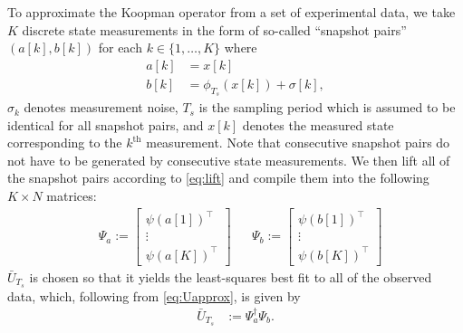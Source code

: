 To approximate the Koopman operator from a set of experimental data, we take $K$ discrete state measurements in the form of so-called ``snapshot pairs'' $(a[k] , b[k])$ for each $k \in \{1,\ldots,K\}$ where
\begin{align}
    a[k] &= x[k] \\
    b[k] &= \phi_{T_s} (x[k]) + \sigma[k],
    \label{eq:ab}
\end{align}
$\sigma_k$ denotes measurement noise, $T_s$ is the sampling period which is assumed to be identical for all snapshot pairs, and $x[k]$ denotes the measured state corresponding to the $k^\text{th}$ measurement.
Note that consecutive snapshot pairs do not have to be generated by consecutive state measurements. 
We then lift all of the snapshot pairs according to \eqref{eq:lift} and compile them into the following ${K \times N}$ matrices:
\begin{align}
    &\Psi_a := \begin{bmatrix} {\psi}(a[1])^\top \\ \vdots \\  {\psi}(a[K])^\top \end{bmatrix}
    &&\Psi_b := \begin{bmatrix} {\psi}(b[1])^\top \\ \vdots \\  {\psi}(b[K])^\top \end{bmatrix}
    \label{eq:Psi}
\end{align}
$\bar{U}_{T_s}$ is chosen so that it yields the least-squares best fit to all of the observed data, which, following from \eqref{eq:Uapprox}, is given by 
\begin{align}
    \bar{U}_{T_s} &:= \Psi_a^\dagger \Psi_b.
\end{align}

